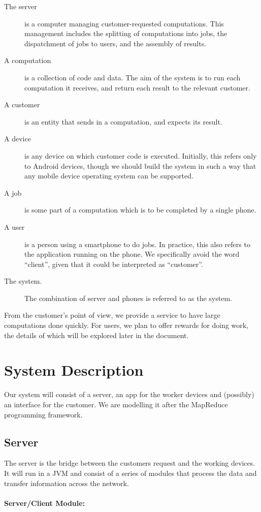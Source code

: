 \documentclass[a4paper,10pt]{article}
\begin{document}
\begin{description}
      \item [The server] is a computer managing customer-requested computations. This management includes the splitting of computations into jobs, the dispatchment of jobs to users, and the assembly of results.
      \item [A computation] is a collection of code and data. The aim of the system is to run each computation it receives, and return each result to the relevant customer.
      \item [A customer] is an entity that sends in a computation, and expects its result.
      \item [A device] is any device on which customer code is executed. Initially, this refers only to Android devices, though we should build the system in such a way that any mobile device operating system can be supported.
      \item [A job] is some part of a computation which is to be completed by a single phone.
      \item [A user] is a person using a smartphone to do jobs. In practice, this also refers to the application running on the phone. We specifically avoid the word “client”, given that it could be interpreted as “customer”.
      \item [The system.] The combination of server and phones is referred to as the system.
\end{description}
From the customer’s point of view, we provide a service to have large computations done quickly. For users, we plan to offer rewards for doing work, the details of which will be explored later in the document.
\section{System Description}
Our system will consist of a server, an app for the worker devices and (possibly) an interface for the customer. We are modelling it after the MapReduce programming framework.

\subsection{Server}
The server is the bridge between the customers request and the working devices. It will run in a JVM and consist of a series of modules that process the data and transfer information across the network. 

\paragraph{Server/Client Module:}
\end{document}
